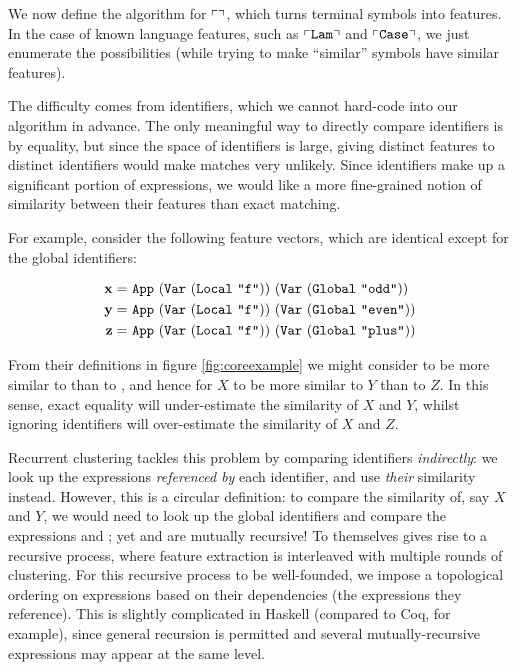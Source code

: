 We now define the algorithm for $\left\ulcorner  \right\urcorner$, which turns terminal symbols into features. In the case of known language features, such as $\left\ulcorner \texttt{Lam} \right\urcorner$ and $\left\ulcorner \texttt{Case} \right\urcorner$, we just enumerate the possibilities (while trying to make ``similar'' symbols have similar features).

The difficulty comes from identifiers, which we cannot hard-code into our algorithm in advance. The only meaningful way to directly compare identifiers is by equality, but since the space of identifiers is large, giving distinct features to distinct identifiers would make matches very unlikely. Since identifiers make up a significant portion of expressions, we would like a more fine-grained notion of similarity between their features than exact matching.

For example, consider the following feature vectors, which are identical except for the global identifiers:

\begin{equation*}
  \begin{split}
    \vect{x} =\ & \texttt{App}\ (\texttt{Var}\ (\texttt{Local}\ \texttt{"f"}))\ (\texttt{Var}\ (\texttt{Global}\ \texttt{"odd"})) \\
    \vect{y} =\ & \texttt{App}\ (\texttt{Var}\ (\texttt{Local}\ \texttt{"f"}))\ (\texttt{Var}\ (\texttt{Global}\ \texttt{"even"})) \\
    \vect{z} =\ & \texttt{App}\ (\texttt{Var}\ (\texttt{Local}\ \texttt{"f"}))\ (\texttt{Var}\ (\texttt{Global}\ \texttt{"plus"}))
  \end{split}
\end{equation*}

From their definitions in figure \ref{fig:coreexample} we might consider  to be more similar to  than to , and hence for $X$ to be more similar to $Y$ than to $Z$. In this sense, exact equality will under-estimate the similarity of $X$ and $Y$, whilst ignoring identifiers will over-estimate the similarity of $X$ and $Z$.

Recurrent clustering tackles this problem by comparing identifiers \emph{indirectly}: we look up the expressions \emph{referenced by} each identifier, and use \emph{their} similarity instead. However, this is a circular definition: to compare the similarity of, say $X$ and $Y$, we would need to look up the global identifiers and compare the expressions  and ; yet  and  are mutually recursive! To  themselves gives rise to a recursive process, where feature extraction is interleaved with multiple rounds of clustering. For this recursive process to be well-founded, we impose a topological ordering on expressions based on their dependencies (the expressions they reference). This is slightly complicated in Haskell (compared to Coq, for example), since general recursion is permitted and several mutually-recursive expressions may appear at the same level.

